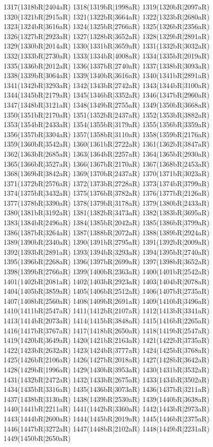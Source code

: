1317(1318bR|2404aR) 1318(1319bR|1998aR) 1319(1320bR|2097aR) 1320(1321bR|2915aR) 1321(1322bR|3664aR) 1322(1323bR|2680aR) \\1323(1324bR|3616aR) 1324(1325bR|2766aR) 1325(1326bR|2356aR) 1326(1327bR|2923aR) 1327(1328bR|3652aR) 1328(1329bR|2891aR) 1329(1330bR|2014aR) 1330(1331bR|3659aR) 1331(1332bR|3032aR) \\1332(1333bR|2730aR) 1333(1334bR|4008aR) 1334(1335bR|2019aR) 1335(1336bR|2012aR) 1336(1337bR|2740aR) 1337(1338bR|3093aR) 1338(1339bR|3064aR) 1339(1340bR|3616aR) 1340(1341bR|2891aR) \\1341(1342bR|3293aR) 1342(1343bR|2742aR) 1343(1344bR|3100aR) 1344(1345bR|2179aR) 1345(1346bR|3352aR) 1346(1347bR|2960aR) 1347(1348bR|3121aR) 1348(1349bR|2755aR) 1349(1350bR|3668aR) \\1350(1351bR|2170aR) 1351(1352bR|2437aR) 1352(1353bR|3882aR) 1353(1354bR|2433aR) 1354(1355bR|3179aR) 1355(1356bR|3359aR) 1356(1357bR|3304aR) 1357(1358bR|3110aR) 1358(1359bR|2176aR) \\1359(1360bR|3542aR) 1360(1361bR|2722aR) 1361(1362bR|3847aR) 1362(1363bR|2685aR) 1363(1364bR|2257aR) 1364(1365bR|2930aR) 1365(1366bR|3527aR) 1366(1367bR|2170aR) 1367(1368bR|2453aR) \\1368(1369bR|3842aR) 1369(1370bR|2437aR) 1370(1371bR|3023aR) 1371(1372bR|2576aR) 1372(1373bR|2728aR) 1373(1374bR|3799aR) 1374(1375bR|3432aR) 1375(1376bR|3782aR) 1376(1377bR|2126aR) \\1377(1378bR|3390aR) 1378(1379bR|3178aR) 1379(1380bR|2433aR) 1380(1381bR|3192aR) 1381(1382bR|3473aR) 1382(1383bR|3695aR) 1383(1384bR|2496aR) 1384(1385bR|2042aR) 1385(1386bR|3799aR) \\1386(1387bR|3264aR) 1387(1388bR|2072aR) 1388(1389bR|2924aR) 1389(1390bR|2340aR) 1390(1391bR|2795aR) 1391(1392bR|2009aR) 1392(1393bR|2891aR) 1393(1394bR|3293aR) 1394(1395bR|2740aR) \\1395(1396bR|2268aR) 1396(1397bR|2699aR) 1397(1398bR|3652aR) 1398(1399bR|2766aR) 1399(1400bR|2363aR) 1400(1401bR|2542aR) 1401(1402bR|2081aR) 1402(1403bR|2923aR) 1403(1404bR|2078aR) \\1404(1405bR|3859aR) 1405(1406bR|2512aR) 1406(1407bR|2735aR) 1407(1408bR|2560aR) 1408(1409bR|2691aR) 1409(1410bR|3496aR) 1410(1411bR|2547aR) 1411(1412bR|2107aR) 1412(1413bR|3341aR) \\1413(1414bR|2073aR) 1414(1415bR|3848aR) 1415(1416bR|2265aR) 1416(1417bR|3767aR) 1417(1418bR|2650aR) 1418(1419bR|2547aR) 1419(1420bR|3649aR) 1420(1421bR|2163aR) 1421(1422bR|3735aR) \\1422(1423bR|2632aR) 1423(1424bR|3777aR) 1424(1425bR|3768aR) 1425(1426bR|2106aR) 1426(1427bR|2018aR) 1427(1428bR|3642aR) 1428(1429bR|1996aR) 1429(1430bR|3953aR) 1430(1431bR|3532aR) \\1431(1432bR|2472aR) 1432(1433bR|2675aR) 1433(1434bR|3502aR) 1434(1435bR|3316aR) 1435(1436bR|3073aR) 1436(1437bR|3211aR) 1437(1438bR|3130aR) 1438(1439bR|2530aR) 1439(1440bR|3638aR) \\1440(1441bR|2211aR) 1441(1442bR|3360aR) 1442(1443bR|2973aR) 1443(1444bR|2600aR) 1444(1445bR|2019aR) 1445(1446bR|2375aR) 1446(1447bR|3272aR) 1447(1448bR|2102aR) 1448(1449bR|2231aR) \\1449(1450bR|2650aR) 